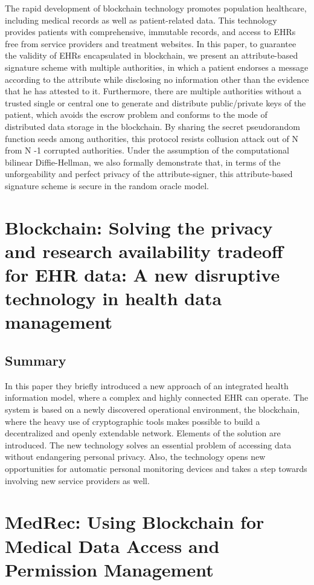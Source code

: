 \documentclass[11pt]{report}
\begin{document}
The rapid development of blockchain technology promotes population healthcare, including medical records as well as patient-related data. This technology provides patients with comprehensive, immutable records, and access to EHRs free from service providers and treatment websites. In this paper, to guarantee the validity of EHRs encapsulated in blockchain, we present an attribute-based signature scheme with multiple authorities, in which a patient endorses a message according to the attribute while disclosing no information other than the evidence that he has attested to it. Furthermore, there are multiple authorities without a trusted single or central one to generate and distribute public/private keys of the patient, which avoids the escrow problem and conforms to the mode of distributed data storage in the blockchain. By sharing the secret pseudorandom function seeds among authorities, this protocol resists collusion attack out of N from N -1 corrupted authorities. Under the assumption of the computational bilinear Diffie-Hellman, we also formally demonstrate that, in terms of the unforgeability and perfect privacy of the attribute-signer, this attribute-based signature scheme is secure in the random oracle model. 


\section{Blockchain: Solving the privacy and research availability tradeoff for EHR data: A new disruptive technology in health data management\cite{2}}

\subsection{Summary}
In  this  paper  they  briefly  introduced  a  new  approach  of  an integrated  health  information  model,  where  a  complex  and  
highly  connected  EHR  can  operate.  The  system  is  based  on  a  newly  discovered  operational  environment,  the  blockchain,  
where  the  heavy  use  of  cryptographic  tools  makes  possible  to build a decentralized and openly extendable network. Elements of  the  solution  are  introduced.  The  new  technology  solves  an  
essential   problem   of   accessing   data   without   endangering   personal privacy. Also, the technology opens new opportunities 
for  automatic  personal  monitoring  devices  and  takes  a  step  
towards involving new service providers as well.  


\section{MedRec: Using Blockchain for Medical Data Access and Permission Management \cite{3}}
\end{document}
